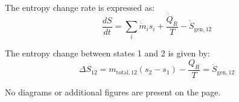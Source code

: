 The entropy change rate is expressed as:  
\[
\frac{dS}{dt} = \sum_i \dot{m}_i s_i + \frac{\dot{Q}_R}{T} - \dot{S}_{\text{gen},12}
\]  

The entropy change between states 1 and 2 is given by:  
\[
\Delta S_{12} = m_{\text{total},12} (s_2 - s_1) - \frac{Q_R}{T} = \dot{S}_{\text{gen},12}
\]  

No diagrams or additional figures are present on the page.